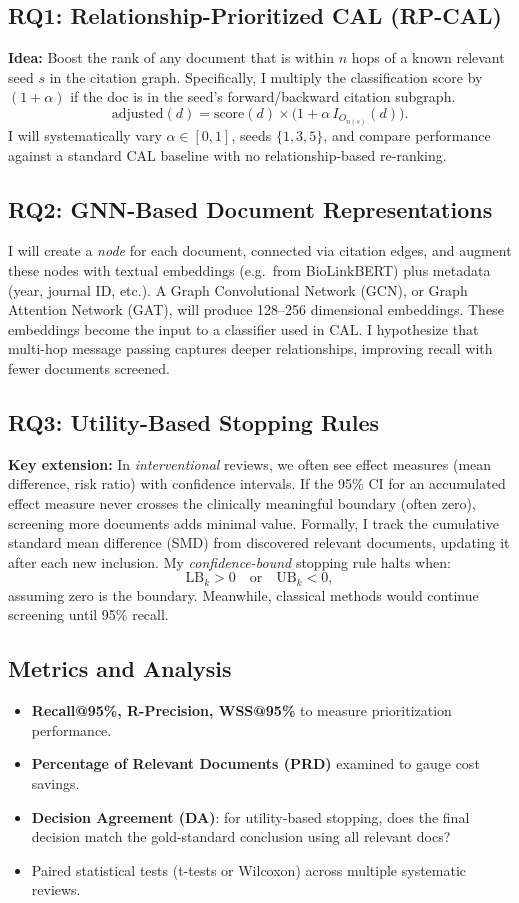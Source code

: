 \documentclass[11pt,a4paper]{article}
\begin{document}
\subsection{RQ1: Relationship-Prioritized CAL (RP-CAL)}
\textbf{Idea:} Boost the rank of any document that is within $n$ hops of a known relevant seed $s$ in the citation graph. Specifically, I multiply the classification score by $(1 + \alpha)$ if the doc is in the seed's forward/backward citation subgraph. 
\[
\text{adjusted}(d) = \text{score}(d)\times \bigl(1 + \alpha\,I_{O_{n(s)}}(d)\bigr).
\]
I will systematically vary $\alpha \in[0,1]$, seeds $\{1,3,5\}$, and compare performance against a standard CAL baseline with no relationship-based re-ranking.

\subsection{RQ2: GNN-Based Document Representations}
I will create a \emph{node} for each document, connected via citation edges, and augment these nodes with textual embeddings (e.g.\ from BioLinkBERT) plus metadata (year, journal ID, etc.). A Graph Convolutional Network (GCN), or Graph Attention Network (GAT), will produce 128--256 dimensional embeddings. These embeddings become the input to a classifier used in CAL. I hypothesize that multi-hop message passing captures deeper relationships, improving recall with fewer documents screened.

\subsection{RQ3: Utility-Based Stopping Rules}
\textbf{Key extension:} In \emph{interventional} reviews, we often see effect measures (mean difference, risk ratio) with confidence intervals. If the 95\% CI for an accumulated effect measure never crosses the clinically meaningful boundary (often zero), screening more documents adds minimal value. Formally, I track the cumulative standard mean difference (SMD) from discovered relevant documents, updating it after each new inclusion. My \emph{confidence-bound} stopping rule halts when:
\[
\text{LB}_k > 0\quad \text{or}\quad \text{UB}_k<0,
\]
assuming zero is the boundary. Meanwhile, classical methods would continue screening until 95\% recall. 

\subsection*{Metrics and Analysis}
\begin{itemize}[leftmargin=1.5em]
\item \textbf{Recall@95\%, R-Precision, WSS@95\%} to measure prioritization performance.
\item \textbf{Percentage of Relevant Documents (PRD)} examined to gauge cost savings.
\item \textbf{Decision Agreement (DA)}: for utility-based stopping, does the final decision match the gold-standard conclusion using all relevant docs?
\item Paired statistical tests (t-tests or Wilcoxon) across multiple systematic reviews.
\end{itemize}
\end{document}
